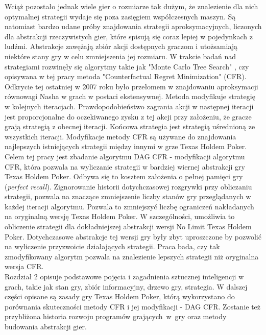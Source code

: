\documentclass[magisterska]{pracamgr}
\begin{document}
\noindent
Wciąż pozostało jednak wiele gier o rozmiarze tak dużym, że znalezienie dla nich optymalnej strategii wydaje
się poza zasięgiem współczesnych maszyn. Są natomiast bardzo udane próby znajdowania strategii aproksymacyjnych,
liczonych dla abstrakcji rzeczywistych gier, które spisują się coraz lepiej w pojedynkach z ludźmi.
Abstrakcje zawężają zbiór akcji dostępnych graczom i utożsamiają niektóre stany gry w celu zmniejszenia jej rozmiaru.
W trakcie badań nad strategiami rozwinęły się algorytmy takie jak "Monte Carlo Tree Search" \cite{monte-carlo-survey}, czy opisywana
w tej pracy metoda "Counterfactual Regret Minimization" (CFR). Odkrycie tej ostatniej w 2007 roku \cite{cfr} było przełomem
w znajdowaniu aproksymacji równowagi Nasha w grach w postaci ekstensywnej. Metoda modyfikuje strategię w kolejnych iteracjach.
Prawdopodobieństwo zagrania akcji w następnej iteracji jest proporcjonalne do oczekiwanego zysku z tej akcji
przy założeniu, że gracze grają strategią z obecnej iteracji. Końcowa strategia jest strategią uśrednioną ze wszystkich iteracji.
Modyfikacje metody CFR są używane do znajdowania najlepszych istniejących strategii między innymi w grze Texas Holdem Poker. \\

\noindent
Celem tej pracy jest zbadanie algorytmu DAG CFR - modyfikacji algorytmu CFR, która pozwala na wyliczanie strategii w bardziej wiernej
abstrakcji gry Texas Holdem Poker. Odbywa się to kosztem założenia o pełnej pamięci gry (\emph{perfect recall}).
Zignorowanie historii dotychczasowej rozgrywki przy obliczaniu strategii, pozwala na znaczące zmniejszenie liczby
stanów gry przeglądanych w każdej iteracji algorytmu. Pozwala to zmniejszyć liczbę ograniczeń nakładanych
na oryginalną wersję Texas Holdem Poker. W szczególności, umożliwia to obliczenie strategii dla dokładniejszej abstrakcji
wersji No Limit Texas Holdem Poker. Dotychczasowe abstrakcje tej wersji gry były zbyt uproszczone by pozwolić na
wyliczenie przyzwoicie działających strategii. Praca bada, czy tak zmodyfikowany algorytm pozwala na znalezienie
lepszych strategii niż oryginalna wersja CFR. \\

\noindent
Rozdział 2 opisuje podstawowe pojęcia i zagadnienia sztucznej inteligencji w grach, takie jak
stan gry, zbiór informacyjny, drzewo gry, strategia. W dalszej części opisane są zasady gry
Texas Holdem Poker, którą wykorzystano do porównania skuteczności metody CFR i jej modyfikacji - DAG CFR.
Zostanie też przybliżona historia rozwoju programów grających~w~gry oraz metody budowania abstrakcji gier. \\
\end{document}
